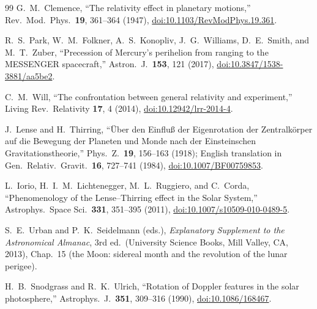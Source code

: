 \documentclass[aps,reprint,amsmath,amssymb,nofootinbib,superscriptaddress,floatfix]{revtex4-2}
\begin{document}
\begin{thebibliography}{99}
G.~M.~Clemence, ``The relativity effect in planetary motions,''
Rev.\ Mod.\ Phys.\ \textbf{19}, 361--364 (1947),
\href{https://doi.org/10.1103/RevModPhys.19.361}
{doi:10.1103/RevModPhys.19.361}.

R.~S.~Park, W.~M.~Folkner, A.~S.~Konopliv, J.~G.~Williams,
D.~E.~Smith, and M.~T.~Zuber, ``Precession of Mercury's perihelion
from ranging to the MESSENGER spacecraft,''
Astron.\ J.\ \textbf{153}, 121 (2017),
\href{https://doi.org/10.3847/1538-3881/aa5be2}
{doi:10.3847/1538-3881/aa5be2}.

C.~M.~Will, ``The confrontation between general relativity and
experiment,'' Living Rev.\ Relativity \textbf{17}, 4 (2014),
\href{https://doi.org/10.12942/lrr-2014-4}{doi:10.12942/lrr-2014-4}.

J.~Lense and H.~Thirring, ``\"Uber den Einflu\ss{} der Eigenrotation
der Zentralk\"orper auf die Bewegung der Planeten und Monde nach der
Einsteinschen Gravitationstheorie,''
Phys.\ Z.\ \textbf{19}, 156--163 (1918); English translation in
Gen.\ Relativ.\ Gravit.\ \textbf{16}, 727--741 (1984),
\href{https://doi.org/10.1007/BF00759853}{doi:10.1007/BF00759853}.

L.~Iorio, H.~I.~M.~Lichtenegger, M.~L.~Ruggiero, and C.~Corda,
``Phenomenology of the Lense--Thirring effect in the Solar System,''
Astrophys.\ Space Sci.\ \textbf{331}, 351--395 (2011),
\href{https://doi.org/10.1007/s10509-010-0489-5}
{doi:10.1007/s10509-010-0489-5}.

S.~E.~Urban and P.~K.~Seidelmann (eds.), \emph{Explanatory Supplement
to the Astronomical Almanac}, 3rd ed.\ (University Science Books,
Mill Valley, CA, 2013), Chap.~15 (the Moon: sidereal month and the
revolution of the lunar perigee).

H.~B.~Snodgrass and R.~K.~Ulrich, ``Rotation of Doppler features in
the solar photosphere,'' Astrophys.\ J.\ \textbf{351}, 309--316
(1990),
\href{https://doi.org/10.1086/168467}{doi:10.1086/168467}.


\end{thebibliography}
\end{document}
